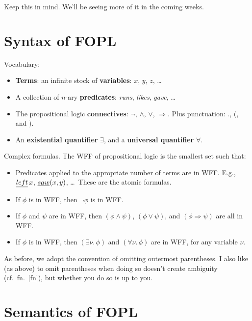 \documentclass{article}
\newcommand{\Ra}{\Rightarrow}
\begin{document}
Keep this in mind. We'll be seeing more of it in the coming weeks.

\section{Syntax of FOPL}

Vocabulary:
\begin{itemize}
  \item
    \textbf{Terms}: an infinite stock of \textbf{variables}: $x$, $y$, $z$, \dots

  \item
    A collection of $n$-ary \textbf{predicates}: \emph{runs}, \emph{likes},
    \emph{gave}, \dots

  \item
    The propositional logic \textbf{connectives}: $\neg$, $\wedge$, $\vee$,
    $\Ra$. Plus punctuation: ${.}$, $($, and $)$.

  \item
    An \textbf{existential quantifier} $\exists$, and a \textbf{universal
    quantifier} $\forall$.
\end{itemize}

Complex formulas. The WFF of propositional logic is the smallest set such
that:
\begin{itemize}
  \item
    Predicates applied to the appropriate number of terms are in WFF\@. E.g.,
    $\emph{left}\,x$, $\emph{saw}(x,y)$, \dots\ These are the atomic formulas. 

  \item
    If $\phi$ is in WFF, then $\neg\phi$ is in WFF\@.
    
  \item
    If $\phi$ and $\psi$ are in WFF, then $(\phi \wedge \psi)$, $(\phi \vee
    \psi)$, and $(\phi \Ra \psi)$ are all in WFF\@.

  \item
    If $\phi$ is in WFF, then $(\exists \nu.\,\phi)$ and $(\forall \nu.\,\phi)$
    are in WFF, for any variable $\nu$.
\end{itemize}

As before, we adopt the convention of omitting outermost parentheses. I also
like (as above) to omit parentheses when doing so doesn't create ambiguity
(cf.~fn.~\ref{fn}), but whether you do so is up to you.

\section{Semantics of FOPL}
\end{document}
